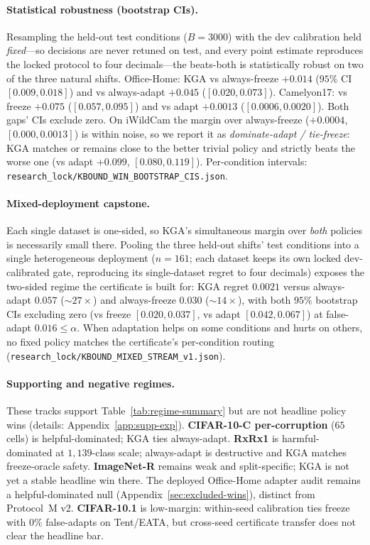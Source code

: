 \documentclass[conference]{IEEEtran}
\theoremstyle{plain}
\theoremstyle{definition}
\theoremstyle{remark}
\begin{document}
\paragraph{Statistical robustness (bootstrap CIs).}
Resampling the held-out test conditions ($B{=}3000$) with the dev calibration held
\emph{fixed}---so decisions are never retuned on test, and every point estimate reproduces
the locked protocol to four decimals---the beats-both is statistically robust on two of the
three natural shifts. Office-Home: \textsc{KGA} vs always-freeze $+0.014$ ($95\%$ CI
$[0.009,0.018]$) and vs always-adapt $+0.045$ ($[0.020,0.073]$). Camelyon17: vs freeze
$+0.075$ ($[0.057,0.095]$) and vs adapt $+0.0013$ ($[0.0006,0.0020]$). Both gaps' CIs exclude
zero. On iWildCam the margin over always-freeze ($+0.0004$, $[0.000,0.0013]$) is within noise,
so we report it as \emph{dominate-adapt / tie-freeze}: \textsc{KGA} matches or remains close to
the better trivial policy and strictly beats the worse one (vs adapt $+0.099$,
$[0.080,0.119]$). Per-condition intervals: \texttt{research\_lock/KBOUND\_WIN\_BOOTSTRAP\_CIS.json}.

\paragraph{Mixed-deployment capstone.}
Each single dataset is one-sided, so \textsc{KGA}'s simultaneous margin over \emph{both}
policies is necessarily small there. Pooling the three held-out shifts' test conditions into a
single heterogeneous deployment ($n{=}161$; each dataset keeps its own locked dev-calibrated
gate, reproducing its single-dataset regret to four decimals) exposes the two-sided regime the
certificate is built for: \textsc{KGA} regret $0.0021$ versus always-adapt $0.057$
($\sim\!27\times$) and always-freeze $0.030$ ($\sim\!14\times$), with both $95\%$ bootstrap CIs
excluding zero (vs freeze $[0.020,0.037]$, vs adapt $[0.042,0.067]$) at false-adapt
$0.016\le\alpha$. When adaptation helps on some conditions and hurts on others, no fixed policy
matches the certificate's per-condition routing
(\texttt{research\_lock/KBOUND\_MIXED\_STREAM\_v1.json}).

\paragraph{Supporting and negative regimes.}
These tracks support Table~\ref{tab:regime-summary} but are not headline policy wins
(details: Appendix~\ref{app:supp-exp}).
\textbf{CIFAR-10-C per-corruption} ($65$ cells) is helpful-dominated; \textsc{KGA} ties
always-adapt.
\textbf{RxRx1} is harmful-dominated at $1{,}139$-class scale; always-adapt is destructive
and \textsc{KGA} matches freeze-oracle safety.
\textbf{ImageNet-R} remains weak and split-specific; \textsc{KGA} is not yet a stable
headline win there. The deployed Office-Home adapter audit remains a helpful-dominated
null (Appendix~\ref{sec:excluded-wins}), distinct from Protocol~M v2.
\textbf{CIFAR-10.1} is low-margin: within-seed calibration ties freeze with $0\%$
false-adapts on Tent/EATA, but cross-seed certificate transfer does not clear the
headline bar.
\end{document}
